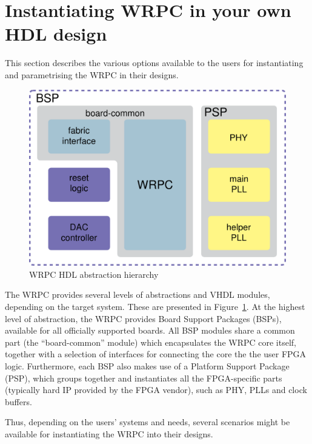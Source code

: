 \section{Instantiating WRPC in your own HDL design}
\label{sec:wrpc_hdl}
This section describes the various options available to the users for instantiating and
parametrising the WRPC in their designs.

\begin{figure}[ht]
  \begin{center}
    \includegraphics[width=.6\textwidth]{fig/wrpc_board.pdf}
    \caption{WRPC HDL abstraction hierarchy}
    \label{fig:wrpc_board}
  \end{center}
\end{figure}

The WRPC provides several levels of abstractions and VHDL modules, depending on the target
system. These are presented in Figure~\ref{fig:wrpc_board}. At the highest level of abstraction, the
WRPC provides Board Support Packages (BSPs), available for all officially supported boards. All BSP
modules share a common part (the ``board-common'' module) which encapsulates the WRPC core itself,
together with a selection of interfaces for connecting the core the the user FPGA
logic. Furthermore, each BSP also makes use of a Platform Support Package (PSP), which groups
together and instantiates all the FPGA-specific parts (typically hard IP provided by the FPGA
vendor), such as PHY, PLLs and clock buffers.

Thus, depending on the users' systems and needs, several scenarios might be available for
instantiating the WRPC into their designs.

